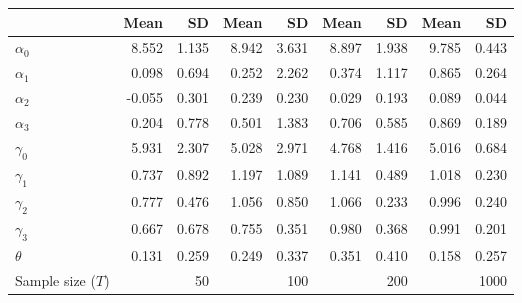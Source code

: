 
\begin{tabular}[t]{lrrrrrrrr}
\toprule
  & Mean & SD & Mean  & SD  & Mean   & SD   & Mean    & SD   \\
\midrule
$\alpha_{0}$ & 8.552 & 1.135 & 8.942 & 3.631 & 8.897 & 1.938 & 9.785 & 0.443\\
$\alpha_{1}$ & 0.098 & 0.694 & 0.252 & 2.262 & 0.374 & 1.117 & 0.865 & 0.264\\
$\alpha_{2}$ & -0.055 & 0.301 & 0.239 & 0.230 & 0.029 & 0.193 & 0.089 & 0.044\\
$\alpha_{3}$ & 0.204 & 0.778 & 0.501 & 1.383 & 0.706 & 0.585 & 0.869 & 0.189\\
$\gamma_{0}$ & 5.931 & 2.307 & 5.028 & 2.971 & 4.768 & 1.416 & 5.016 & 0.684\\
$\gamma_{1}$ & 0.737 & 0.892 & 1.197 & 1.089 & 1.141 & 0.489 & 1.018 & 0.230\\
$\gamma_{2}$ & 0.777 & 0.476 & 1.056 & 0.850 & 1.066 & 0.233 & 0.996 & 0.240\\
$\gamma_{3}$ & 0.667 & 0.678 & 0.755 & 0.351 & 0.980 & 0.368 & 0.991 & 0.201\\
$\theta$ & 0.131 & 0.259 & 0.249 & 0.337 & 0.351 & 0.410 & 0.158 & 0.257\\
Sample size ($T$) &  & 50 &  & 100 &  & 200 &  & 1000\\
\bottomrule
\end{tabular}
